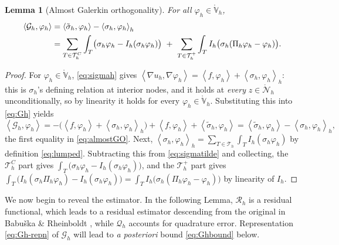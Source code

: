 \documentclass[12pt]{amsart}
\numberwithin{equation}{section}
\theoremstyle{plain}
\newtheorem{lemma}[theorem]{Lemma}
\theoremstyle{definition}
\theoremstyle{remark}
\newcommand{\Th}{\mathcal{T}_h}
\newcommand{\Vhr}{\mathring{\mathbb{V}}_h}
\newcommand{\Nhr}{\mathring{\mathcal{N}}_h}
\newcommand{\Ih}{I_h}
\newcommand{\Pih}{\Pi_h}
\newcommand{\Thplus}{\Th^+}
\newcommand{\ThC}{\Th^C}
\newcommand{\Gh}{\mathcal{G}_h}
\newcommand{\Rh}{\mathcal{R}_h}
\newcommand{\Qh}{\mathcal{Q}_h}
\begin{document}
\begin{lemma}[Almost Galerkin orthogonality]
\label{lem:almostGO}
For all $\varphi_h \in \Vhr$,
\begin{align}
\label{eq:almostGO}
  \left< \Gh, \varphi_h\right> &= \left<\tilde\sigma_h,\varphi_h\right> - \left< \sigma_h,\varphi_h\right>_h \\
  &= \sum_{T\in\ThC}\int_T \bigl(\sigma_h\varphi_h - \Ih(\sigma_h\varphi_h)\bigr)
  \ +\ \sum_{T\in\Thplus}\int_T \Ih\bigl(\sigma_h(\Pih\varphi_h - \varphi_h)\bigr). \notag
\end{align}
\end{lemma}

\begin{proof}
For $\varphi_h\in\Vhr$, \eqref{eq:sigmah} gives $\left<\nabla u_h,\nabla\varphi_h\right> = \left< f,\varphi_h\right> + \left<\sigma_h,\varphi_h\right>_h$: this is $\sigma_h$'s defining relation at interior nodes, and it holds at \emph{every} $z\in\Nhr$ unconditionally, so by linearity it holds for every $\varphi_h \in \Vhr$.  Substituting this into \eqref{eq:Gh} yields
   $$\left<\Gh,\varphi_h\right> = -\bigl(\left< f,\varphi_h\right> + \left<\sigma_h,\varphi_h\right>_h\bigr) + \left< f,\varphi_h\right> + \left<\tilde\sigma_h,\varphi_h\right> = \left<\tilde\sigma_h,\varphi_h\right> - \left<\sigma_h,\varphi_h\right>_h,$$
the first equality in \eqref{eq:almostGO}.  Next, $\left<\sigma_h,\varphi_h\right>_h = \sum_{T\in\Th}\int_T \Ih(\sigma_h\varphi_h)$ by definition \eqref{eq:lumped}.  Subtracting this from \eqref{eq:sigmatilde} and collecting, the $\ThC$ part gives $\int_T \bigl(\sigma_h\varphi_h - \Ih(\sigma_h\varphi_h)\bigr)$, and the $\Thplus$ part gives $\int_T \bigl(\Ih(\sigma_h\Pih\varphi_h) - \Ih(\sigma_h\varphi_h)\bigr) = \int_T \Ih\bigl(\sigma_h(\Pih\varphi_h-\varphi_h)\bigr)$ by linearity of $\Ih$.
\end{proof}

We now begin to reveal the estimator.  In the following Lemma, $\Rh$ is a residual functional, which leads to a residual estimator descending from the original in Babuška \& Rheinboldt \cite{BabuskaRheinboldt1978}, while $\Qh$ accounts for quadrature error.  Representation \eqref{eq:Gh-repn} of $\Gh$ will lead to \emph{a posteriori} bound \eqref{eq:Ghbound} below.
\end{document}
